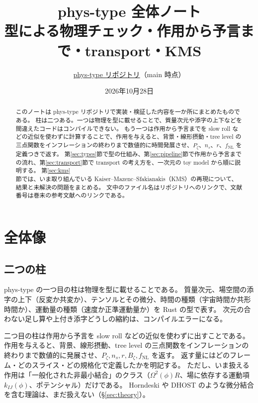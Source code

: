 \documentclass[a4paper,11pt]{ltjsarticle}
\title{phys-type 全体ノート\\[0.3em]
\large 型による物理チェック・作用から予言まで・transport・KMS}
\author{\href{\repourl}{phys-type リポジトリ}（main \href{\repourl/tree/\reporev}{\code{\reporev}} 時点）}
\date{2026年10月28日}
\newcommand{\fnl}{f_{\mathrm{NL}}}
\begin{document}
\maketitle

\begin{abstract}
このノートは phys-type リポジトリで実装・検証した内容を一か所にまとめたものである。
柱は二つある。一つは物理を型に載せることで、質量次元や添字の上下などを間違えたコードはコンパイルできない。
もう一つは作用から予言までを slow roll などの近似を使わずに計算することで、作用を与えると、背景・線形摂動・tree level の三点関数をインフレーションの終わりまで数値的に時間発展させ、$P_\zeta$、$n_s$、$r$、$\fnl$ を定義つきで返す。
第\ref{sec:types}節で型の仕組み、第\ref{sec:pipeline}節で作用から予言までの流れ、第\ref{sec:transport}節で transport の考え方を、一次元の toy model から順に説明する。
第\ref{sec:kms}節では、いま取り組んでいる Kaiser--Mazenc--Sfakianakis（KMS）\cite{KMS2013}の再現について、結果と未解決の問題をまとめる。
文中のファイル名はリポジトリへのリンクで、文献番号は巻末の参考文献へのリンクである。
\end{abstract}

\tableofcontents
\newpage

\section{全体像}
\label{sec:overview}

\subsection{二つの柱}

phys-type の一つ目の柱は物理を型に載せることである。
質量次元、場空間の添字の上下（反変か共変か）、テンソルとその微分、時間の種類（宇宙時間か共形時間か）、運動量の種類（速度か正準運動量か）を Rust の型で表す。
次元の合わない足し算や上付き添字どうしの縮約は、コンパイルエラーになる。

二つ目の柱は作用から予言を slow roll などの近似を使わずに出すことである。
作用を与えると、背景、線形摂動、tree level の三点関数をインフレーションの終わりまで数値的に発展させ、$P_\zeta, n_s, r, B_\zeta, \fnl$ を返す。
返す量にはどのフレーム・どのスライス・どの規格化で定義したかを明記する。
ただし、いま扱える作用は「一般化された非最小結合」のクラス（$\Omega^2(\phi)R$、場に依存する運動項 $k_{IJ}(\phi)$、ポテンシャル）だけである。
Horndeski や DHOST のような微分結合を含む理論は、まだ扱えない（\S\ref{sec:theory}）。
\end{document}
